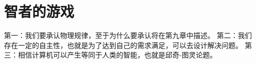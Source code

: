 \section{智者的游戏}

第一：我们要承认物理规律，至于为什么要承认将在第九章中描述。
第二：我们存在一定的自主性，也就是为了达到自己的需求满足，可以去设计解决问题。
第三：相信计算机可以产生等同于人类的智能，也就是邱奇-图灵论题。
